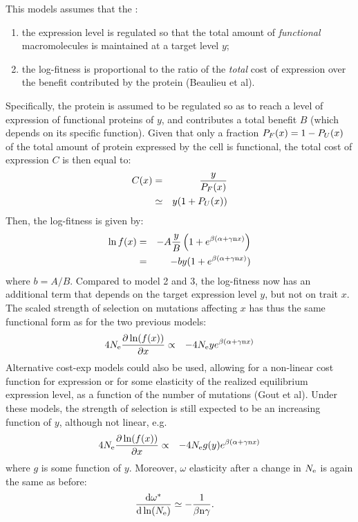 \documentclass{article}
\begin{document}
This models assumes that the :
\begin{enumerate}
	\item the expression level is regulated so that the total amount of \emph{functional} macromolecules is maintained at a target level $y$;
	\item the log-fitness is proportional to the ratio of the \emph{total} cost of expression over the benefit contributed by the protein (Beaulieu et al).
\end{enumerate}
Specifically, the protein is assumed to be regulated so as to reach a level of expression of functional proteins of $y$, and contributes a total benefit $B$ (which depends on its specific function). Given that only a fraction $P_{F}(x) = 1-P_{U}(x)$ of the total amount of protein expressed by the cell is functional, the total cost of expression $C$ is then equal to:
\begin{eqnarray}
C(x) &=& \frac{y}{P_{F}(x)}
\\ &\simeq& y (1 + P_{U}(x))
\end{eqnarray}
Then, the log-fitness is given by:
\begin{eqnarray}
\ln f (x) & = & -A \frac{y}{B} \left( 1 + e^{\beta(\alpha + \gamma\text{n} x)} \right)
\\
&=& -by (1 + e^{\beta(\alpha + \gamma\text{n} x)})
\end{eqnarray}
where $b = A /B$. Compared to model 2 and 3, the log-fitness now has an additional term that depends on the target expression level $y$, but not on trait $x$. The scaled strength of selection on mutations affecting $x$ has thus the same functional form as for the two previous models:
\begin{eqnarray}
4 N_{\mathrm{e}} \frac{\partial \ln (f(x))}{\partial x} &\propto& -4 N_{\mathrm{e}} y e^{\beta(\alpha + \gamma\text{n} x)}
\end{eqnarray}
Alternative cost-exp models could also be used, allowing for a non-linear cost function for expression or for some elasticity of the realized equilibrium expression level, as a function of the number of mutations (Gout et al). Under these models, the strength of selection is still expected to be an increasing function of $y$, although not linear, e.g.
\begin{eqnarray}
4 N_{\mathrm{e}} \frac{\partial \ln (f(x))}{\partial x} &\propto& -4 N_{\mathrm{e}} g(y) e^{\beta(\alpha + \gamma\text{n} x)}
\end{eqnarray}
where $g$ is some function of $y$.
Moreover, $\omega$ elasticity after a change in $N_{\mathrm{e}}$ is again the same as before:
\begin{align}
\frac{ \mathrm{d} \omega^{*}}{\mathrm{d} \ln (N_{\mathrm{e}})} & \simeq - \frac{1}{\beta \text{n} \gamma}.
\end{align}
\end{document}
